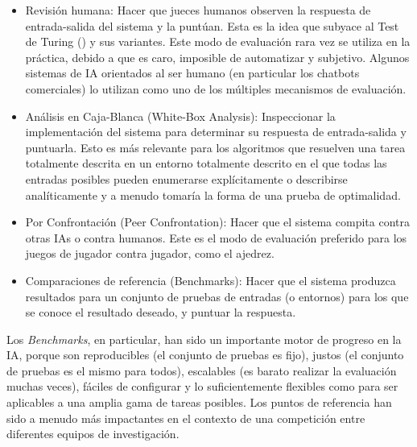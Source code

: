 \begin{itemize}
\item Revisión humana: Hacer que jueces humanos observen la respuesta de entrada-salida del sistema y la puntúan. Esta es la idea que subyace al Test de Turing (\cite{pinar2000turing}) y sus variantes. Este modo de evaluación rara vez se utiliza en la práctica, debido a que es caro, imposible de automatizar y subjetivo. Algunos sistemas de IA orientados al ser humano (en particular los chatbots comerciales) lo utilizan como uno de los múltiples mecanismos de evaluación.

\item Análisis en Caja-Blanca (White-Box Analysis): Inspeccionar la implementación del sistema para determinar su respuesta de entrada-salida y puntuarla. Esto es más relevante para los algoritmos que resuelven una tarea totalmente descrita en un entorno totalmente descrito en el que todas las entradas posibles pueden enumerarse explícitamente o describirse analíticamente y a menudo tomaría la forma de una prueba de optimalidad.

\item Por Confrontación (Peer Confrontation): Hacer que el sistema compita contra otras IAs o contra humanos. Este es el modo de evaluación preferido para los juegos de jugador contra jugador, como el ajedrez.

\item Comparaciones de referencia (Benchmarks): Hacer que el sistema produzca resultados para un conjunto de pruebas de entradas (o entornos) para los que se conoce el resultado deseado, y puntuar la respuesta.
\end{itemize}

Los \textit{Benchmarks}, en particular, han sido un importante motor de progreso en la IA, porque son reproducibles (el conjunto de pruebas es fijo), justos (el conjunto de pruebas es el mismo para todos), escalables (es barato realizar la evaluación muchas veces), fáciles de configurar y lo suficientemente flexibles como para ser aplicables a una amplia gama de tareas posibles. Los puntos de referencia han sido a menudo más impactantes en el contexto de una competición entre diferentes equipos de investigación.

